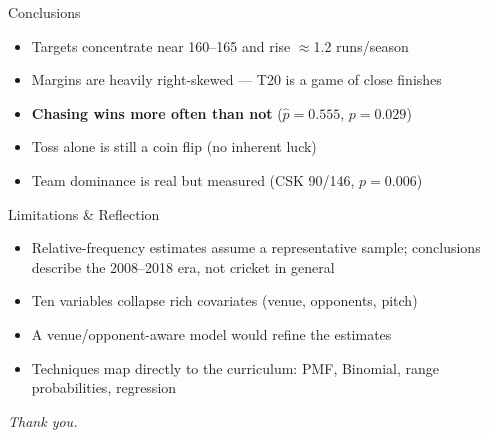 \documentclass[aspectratio=169]{beamer}
\begin{document}
\begin{frame}{Conclusions}
\begin{itemize}
\setlength\itemsep{0.7em}
\item Targets concentrate near 160--165 and rise $\approx$1.2 runs/season
\item Margins are heavily right-skewed --- T20 is a game of close finishes
\item \textbf{Chasing wins more often than not} ($\hat p=0.555$, $p=0.029$)
\item Toss alone is still a coin flip (no inherent luck)
\item Team dominance is real but measured (CSK 90/146, $p=0.006$)
\end{itemize}
\end{frame}

\begin{frame}{Limitations \& Reflection}
\begin{itemize}
\setlength\itemsep{0.7em}
\item Relative-frequency estimates assume a representative sample;
  conclusions describe the 2008--2018 era, not cricket in general
\item Ten variables collapse rich covariates (venue, opponents, pitch)
\item A venue/opponent-aware model would refine the estimates
\item Techniques map directly to the curriculum: PMF, Binomial, range
  probabilities, regression
\end{itemize}
\vspace{0.6em}
\begin{center}
\emph{Thank you.}
\end{center}
\end{frame}
\end{document}
